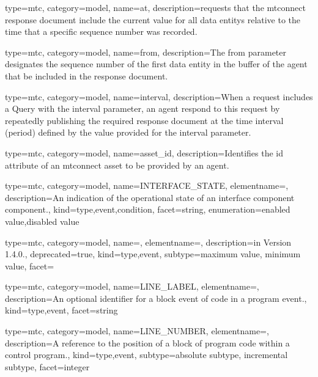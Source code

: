 {
  type=mtc,
  category=model,
  name={at},
  description={\glspl{request} that the \gls{mtconnect response document} \MUST include the current value for all \glspl{data entity} relative to the time that a specific sequence number was recorded.}
}

{
  type=mtc,
  category=model,
  name={from},
  description={The from parameter designates the sequence number of the first \gls{data entity} in the buffer of the \gls{agent} that \MUST be included in the \gls{response document}.}
}



{
  type=mtc,
  category=model,
  name={interval},
  description={When a \gls{request} includes a Query with the interval parameter, an \gls{agent} \MUST respond to this \gls{request} by repeatedly publishing the required \gls{response document} at the time interval (period) defined by the value provided for the interval parameter.}
}


{
  type=mtc,
  category=model,
  name={asset\_id},
  description={Identifies the id attribute of an \gls{mtconnect asset} to be provided by an \gls{agent}.}
}



{
  type=mtc,
  category=model,
  name={INTERFACE\_STATE},
  elementname=,
  description={An indication of the operational state of an \gls{interface component} component.},
  kind={type,event,condition},
  facet={\gls{string}},
  enumeration={\gls{enabled value},\gls{disabled value}}
}


{
  type=mtc,
  category=model,
  name=,
  elementname=,
  description={\DEPRECATED in Version 1.4.0.},
  deprecated={true},
  kind={type,event},
  subtype={\gls{maximum value}, \gls{minimum value}},
  facet={}
}



{
  type=mtc,
  category=model,
  name={LINE\_LABEL},
  elementname=,
  description={An optional identifier for a \gls{block event} of code in a \gls{program event}.},
  kind={type,event},
  facet={\gls{string}}
}


{
  type=mtc,
  category=model,
  name={LINE\_NUMBER},
  elementname=,
  description={A reference to the position of a block of program code within a control program.},
  kind={type,event},
  subtype={\gls{absolute subtype}, \gls{incremental subtype}},
  facet={\gls{integer}}
}


